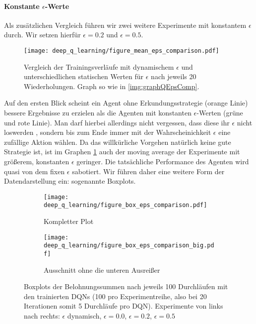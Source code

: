 \paragraph{Konstante $ \epsilon $-Werte}
Als zusätzlichen Vergleich führen wir zwei weitere Experimente mit konstantem $ \epsilon $ durch. Wir setzen hierfür $ \epsilon = 0.2 $ und $ \epsilon = 0.5 $.
\begin{figure}[h!]
    \centering
    \texttt{[image: deep\_q\_learning/figure\_mean\_eps\_comparison.pdf]}
    \caption{Vergleich der Trainingsverläufe mit dynamischem $ \epsilon $ und unterschiedlichen statischen Werten für $ \epsilon $ nach jeweils 20 Wiederholungen. Graph so wie in \ref{img:graphQEpsComp}.} \label{img:graphEpsComparison}
\end{figure}
Auf den ersten Blick scheint ein Agent ohne Erkundungsstrategie (orange Linie) bessere Ergebnisse zu erzielen als die Agenten mit konstanten $ \epsilon $-Werten (grüne und rote Linie). Man darf hierbei allerdings nicht vergessen, dass diese ihr $ \epsilon $ nicht \glqq loswerden \grqq{}, sondern bis zum Ende immer mit der Wahrscheinichkeit $ \epsilon $ eine zufällige Aktion wählen. Da das willkürliche Vorgehen natürlich keine gute Strategie ist, ist im Graphen \ref{img:graphEpsComparison} auch der moving average der Experimente mit größerem, konstanten $ \epsilon $ geringer. Die tatsächliche Performance des Agenten wird quasi von dem fixen $ \epsilon $ sabotiert. Wir führen daher eine weitere Form der Datendarstellung ein: sogenannte Boxplots.
\begin{figure}[h!]
    \centering
    \begin{subfigure}[b]{0.7\textwidth}
        \texttt{[image: deep\_q\_learning/figure\_box\_eps\_comparison.pdf]}
        \caption{Kompletter Plot}
        \label{img:graphBoxEpsComparison}
    \end{subfigure}
    \begin{subfigure}[b]{0.7\textwidth}
        \texttt{[image: deep\_q\_learning/figure\_box\_eps\_comparison\_big.pdf]}
        \caption{Ausschnitt ohne die unteren Ausreißer}
        \label{img:graphBoxEpsComparisonBig}
    \end{subfigure}
    \caption{Boxplots der Belohnungssummen nach jeweils 100 Durchläufen mit den trainierten DQNs (100 pro Experimentreihe, also bei 20 Iterationen somit 5 Durchläufe pro DQN). Experimente von links nach rechts: $ \epsilon $ dynamisch, $ \epsilon = 0.0 $, $ \epsilon = 0.2 $, $ \epsilon = 0.5 $}
    \label{img:graphBoxEpsComparisonBoth}
\end{figure}

